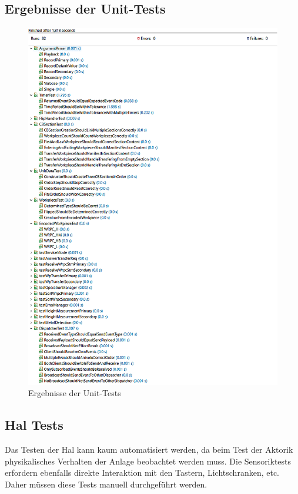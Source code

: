 \subsection{Ergebnisse der Unit-Tests}\label{subsec:unit-tests-results}
\begin{figure}[H]
    \centering
    \includegraphics[scale = 0.45]{anhang/unit-test-execution.png}
    \caption{Ergebnisse der Unit-Tests}
    \label{fig:unit-test-execution}
\end{figure}


\subsection{Hal Tests}\label{subsec:hal-tests}

Das Testen der Hal kann kaum automatisiert werden, da beim Test der Aktorik physikalisches Verhalten der Anlage beobachtet werden muss.
Die Sensoriktests erfordern ebenfalls direkte Interaktion mit den Tastern, Lichtschranken, etc.
Daher müssen diese Tests manuell durchgeführt werden.

